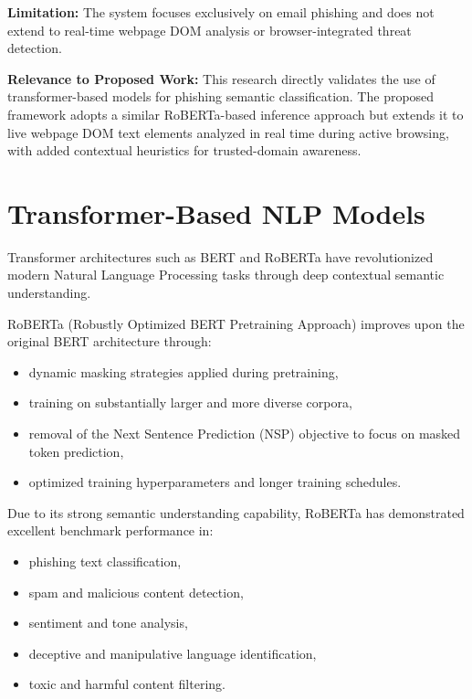 \vspace{0.3cm}

\textbf{Limitation:}
The system focuses exclusively on email phishing and does not extend to real-time webpage DOM analysis or browser-integrated threat detection.

\vspace{0.3cm}

\textbf{Relevance to Proposed Work:}
This research directly validates the use of transformer-based models for phishing semantic classification. The proposed framework adopts a similar RoBERTa-based inference approach but extends it to live webpage DOM text elements analyzed in real time during active browsing, with added contextual heuristics for trusted-domain awareness.


\section{Transformer-Based NLP Models}

Transformer architectures such as BERT and RoBERTa have revolutionized modern Natural Language Processing tasks through deep contextual semantic understanding.

RoBERTa (Robustly Optimized BERT Pretraining Approach) improves upon the original BERT architecture through:
\begin{itemize}
\item dynamic masking strategies applied during pretraining,
\item training on substantially larger and more diverse corpora,
\item removal of the Next Sentence Prediction (NSP) objective to focus on masked token prediction,
\item optimized training hyperparameters and longer training schedules.
\end{itemize}

Due to its strong semantic understanding capability, RoBERTa has demonstrated excellent benchmark performance in:
\begin{itemize}
\item phishing text classification,
\item spam and malicious content detection,
\item sentiment and tone analysis,
\item deceptive and manipulative language identification,
\item toxic and harmful content filtering.
\end{itemize}

